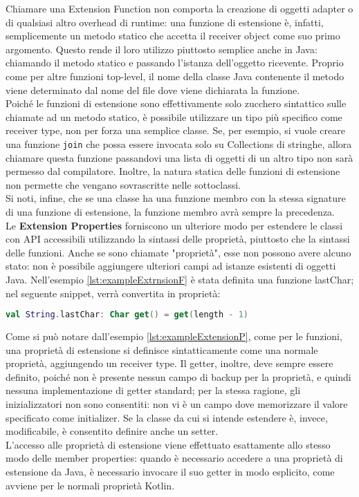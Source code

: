 Chiamare una Extension Function non comporta la creazione di oggetti adapter o di qualsiasi altro overhead di runtime: una funzione di estensione è, infatti, semplicemente un metodo statico che accetta il receiver object come suo primo argomento. Questo rende il loro utilizzo piuttosto semplice anche in Java: chiamando il metodo statico e passando l'istanza dell'oggetto ricevente. Proprio come per altre funzioni top-level, il nome della classe Java contenente il metodo viene determinato dal nome del file dove viene dichiarata la funzione.\\
Poiché le funzioni di estensione sono effettivamente solo zucchero sintattico sulle chiamate ad un metodo statico, è possibile utilizzare un tipo più specifico come receiver type, non per forza una semplice classe. Se, per esempio, si vuole creare una funzione \texttt{join} che possa essere invocata solo su Collections di stringhe, allora chiamare questa funzione passandovi una lista di oggetti di un altro tipo non sarà permesso dal compilatore. Inoltre, la natura statica delle funzioni di estensione non permette che vengano sovrascritte nelle sottoclassi.\\
Si noti, infine, che se una classe ha una funzione membro con la stessa signature di una funzione di estensione, la funzione membro avrà sempre la precedenza.\\

Le {\bfseries Extension Properties} forniscono un ulteriore modo per estendere le classi con API accessibili utilizzando la sintassi delle proprietà, piuttosto che la sintassi delle funzioni. Anche se sono chiamate "proprietà", esse non possono avere alcuno stato: non è possibile aggiungere ulteriori campi ad istanze esistenti di oggetti Java. Nell'esempio \ref{lst:exampleExtrnsionF} è stata definita una funzione lastChar; nel seguente snippet, verrà convertita in proprietà:\\

\begin{lstlisting}[caption={Definizione di una Extension Property}, captionpos=b, label={lst:exampleExtensionP}, language=Kotlin]
val String.lastChar: Char get() = get(length - 1)
\end{lstlisting}

Come si può notare dall'esempio \ref{lst:exampleExtensionP}, come per le funzioni, una proprietà di estensione si definisce sintatticamente come una normale proprietà, aggiungendo un receiver type. Il getter, inoltre, deve sempre essere definito, poiché non è presente nessun campo di backup per la proprietà, e quindi nessuna implementazione di getter standard; per la stessa ragione, gli inizializzatori non sono consentiti: non vi è un campo dove memorizzare il valore specificato come initializer. Se la classe da cui si intende estendere è, invece, modificabile, è consentito definire anche un setter.\\
L'accesso alle proprietà di estensione viene effettuato esattamente allo stesso modo delle member properties: quando è necessario accedere a una proprietà di estensione da Java, è necessario invocare il suo getter in modo esplicito, come avviene per le normali proprietà Kotlin.\\


